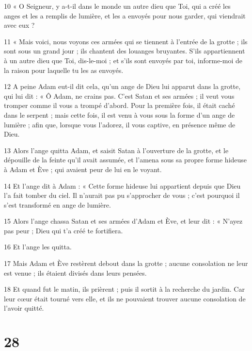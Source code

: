 \par 10 « O Seigneur, y a-t-il dans le monde un autre dieu que Toi, qui a créé les anges et les a remplis de lumière, et les a envoyés pour nous garder, qui viendrait avec eux ?

\par 11 « Mais voici, nous voyons ces armées qui se tiennent à l'entrée de la grotte ; ils sont sous un grand jour ; ils chantent des louanges bruyantes. S'ils appartiennent à un autre dieu que Toi, dis-le-moi ; et s'ils sont envoyés par toi, informe-moi de la raison pour laquelle tu les as envoyés.

\par 12 A peine Adam eut-il dit cela, qu'un ange de Dieu lui apparut dans la grotte, qui lui dit : « Ô Adam, ne crains pas. C'est Satan et ses armées ; il veut vous tromper comme il vous a trompé d'abord. Pour la première fois, il était caché dans le serpent ; mais cette fois, il est venu à vous sous la forme d'un ange de lumière ; afin que, lorsque vous l'adorez, il vous captive, en présence même de Dieu.

\par 13 Alors l'ange quitta Adam, et saisit Satan à l'ouverture de la grotte, et le dépouille de la feinte qu'il avait assumée, et l'amena sous sa propre forme hideuse à Adam et Ève ; qui avaient peur de lui en le voyant.

\par 14 Et l'ange dit à Adam : « Cette forme hideuse lui appartient depuis que Dieu l'a fait tomber du ciel. Il n'aurait pas pu s'approcher de vous ; c’est pourquoi il s’est transformé en ange de lumière.

\par 15 Alors l'ange chassa Satan et ses armées d'Adam et Ève, et leur dit : « N'ayez pas peur ; Dieu qui t’a créé te fortifiera.

\par 16 Et l'ange les quitta.

\par 17 Mais Adam et Ève restèrent debout dans la grotte ; aucune consolation ne leur est venue ; ils étaient divisés dans leurs pensées.

\par 18 Et quand fut le matin, ils prièrent ; puis il sortit à la recherche du jardin. Car leur cœur était tourné vers elle, et ils ne pouvaient trouver aucune consolation de l’avoir quitté.

\chapter{28}

